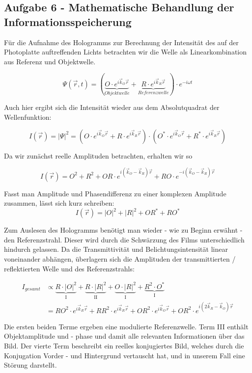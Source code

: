 \subsection*{Aufgabe 6 - Mathematische Behandlung der Informationsspeicherung}
Für die Aufnahme des Hologramms zur Berechnung der Intensität des auf der Photoplatte auftreffenden Lichts betrachten wir die Welle als Linearkombination aus Referenz und Objektwelle.

\begin{equation}
	\Psi(\vec{r},t) = (\underbrace{O\cdot e^{i\vec{k}_O\vec{r}}}_{Objektwelle} + \underbrace{R\cdot e^{i\vec{k}_R\vec{r}}}_{Referenzwelle})\cdot e^{-i\omega t}
\end{equation}

Auch hier ergibt sich die Intensität wieder aus dem Absolutquadrat der Wellenfunktion:

\begin{equation}
	I(\vec{r}) = \left| \Psi \right|^2 = (O\cdot e^{i\vec{k}_O\vec{r}} + R\cdot e^{i\vec{k}_R\vec{r}})\cdot (O^*\cdot e^{i\vec{k}_O\vec{r}} + R^*\cdot e^{i\vec{k}_R\vec{r}})
\end{equation}

Da wir zunächst reelle Amplituden betrachten, erhalten wir so

\begin{equation}
	I(\vec{r}) = O^2 + R^2 + OR\cdot e^{i(\vec{k}_O -\vec{k}_R)\vec{r}} + RO \cdot e^{-i(\vec{k}_O -\vec{k}_R)\vec{r}}
\end{equation}

Fasst man Amplitude und Phasendifferenz zu einer komplexen Amplitude zusammen, lässt sich kurz schreiben:
\begin{equation}
	I(\vec{r}) = \left| O \right|^2 + \left| R \right|^2 + OR^* + RO^*
\end{equation}

Zum Auslesen des Hologramms benötigt man wieder - wie zu Beginn erwähnt - den Referenzstrahl. Dieser wird durch die Schwärzung des Films unterschiedlich hindurch gelassen. Da die Transmittivität und Belichtungsintensität linear voneinander abhängen,  überlagern sich die Amplituden der transmittierten / reflektierten Welle und des Referenzstrahls:

\begin{align}
	I_{gesamt} &\propto \underbrace{R \cdot \left| O \right|^2}_{\text{I}} + \underbrace{R \cdot \left| R \right|^2}_{\text{II}} + \underbrace{O \cdot \left| R \right|^2}_{\text{I}} + \underbrace{R^2 \cdot O^*}_{\text{I}}\\
	&= RO^2\cdot e^{i\vec{k}_R\vec{r}} + RR^2\cdot e^{i\vec{k}_R\vec{r}} + OR^2\cdot e^{i\vec{k}_O\vec{r}} + OR^2\cdot e^{i(2\vec{k}_R - \vec{k}_O)\vec{r}}
\end{align}

Die ersten beiden Terme ergeben eine modulierte Referenzwelle. Term III enthält Objektamplitude und - phase und damit alle relevanten Informationen über das Bild. Der vierte Term beschreibt ein reelles konjugiertes Bild, welches durch die Konjugation Vorder - und Hintergrund vertauscht hat, und in unserem Fall eine Störung darstellt.